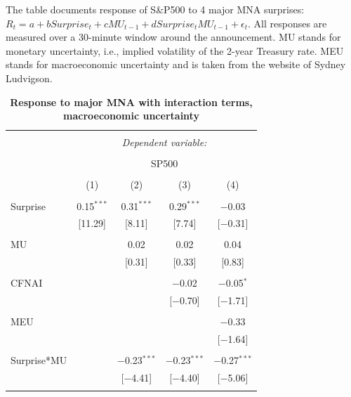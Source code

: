 \documentclass[12pt]{article}
\begin{document}
\begin{table}[!htbp] \centering 
  \caption{\textbf{Response to major MNA with interaction terms, macroeconomic uncertainty}} 
  \label{}
    \begin{flushleft}
    {\medskip\small
 The table documents response of S\&P500 to 4 major MNA surprises: $R_t = a + b Surprise_t + c MU_{t-1} + d Surprise_t MU_{t-1} + \epsilon_t.$ All responses are measured over a 30-minute window around the announcement. MU stands for monetary uncertainty, i.e., implied volatility of the 2-year Treasury rate. MEU stands for macroeconomic uncertainty and is taken from the website of Sydney Ludvigson.}
    \medskip
    \end{flushleft}
\begin{tabular}{@{\extracolsep{5pt}}lcccc} 
\\[-1.8ex]\hline 
\hline \\[-1.8ex] 
 & \multicolumn{4}{c}{\textit{Dependent variable:}} \\ 
\cline{2-5} 
\\[-1.8ex] & \multicolumn{4}{c}{SP500} \\ 
\\[-1.8ex] & (1) & (2) & (3) & (4)\\ 
\hline \\[-1.8ex] 
 Surprise & 0.15$^{***}$ & 0.31$^{***}$ & 0.29$^{***}$ & $-$0.03 \\ 
  & [11.29] & [8.11] & [7.74] & [$-$0.31] \\ 
  & & & & \\ 
 MU &  & 0.02 & 0.02 & 0.04 \\ 
  &  & [0.31] & [0.33] & [0.83] \\ 
  & & & & \\ 
 CFNAI &  &  & $-$0.02 & $-$0.05$^{*}$ \\ 
  &  &  & [$-$0.70] & [$-$1.71] \\ 
  & & & & \\ 
 MEU &  &  &  & $-$0.33 \\ 
  &  &  &  & [$-$1.64] \\ 
  & & & & \\ 
 Surprise*MU &  & $-$0.23$^{***}$ & $-$0.23$^{***}$ & $-$0.27$^{***}$ \\ 
  &  & [$-$4.41] & [$-$4.40] & [$-$5.06] \\ 
  & & & & \\ 

\end{tabular}
\end{table}
\end{document}
